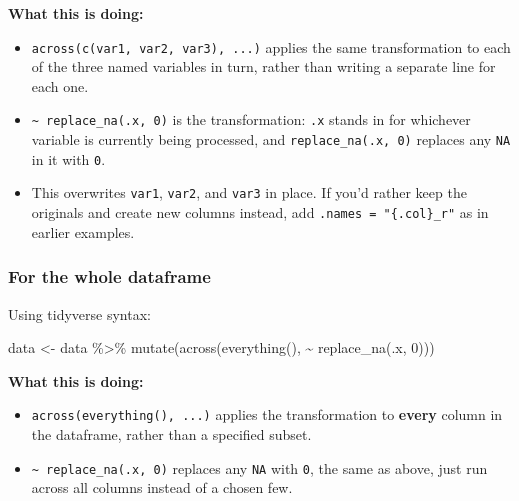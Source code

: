 \documentclass[
  letterpaper,
  DIV=11,
  numbers=noendperiod]{scrreprt}
\newenvironment{Shaded}{\begin{snugshade}}{\end{snugshade}}
\newcommand{\DecValTok}[1]{\textcolor[rgb]{0.68,0.00,0.00}{#1}}
\newcommand{\FunctionTok}[1]{\textcolor[rgb]{0.28,0.35,0.67}{#1}}
\newcommand{\NormalTok}[1]{\textcolor[rgb]{0.00,0.23,0.31}{#1}}
\newcommand{\OtherTok}[1]{\textcolor[rgb]{0.00,0.23,0.31}{#1}}
\newcommand{\SpecialCharTok}[1]{\textcolor[rgb]{0.37,0.37,0.37}{#1}}
\begin{document}
\textbf{What this is doing:}

\begin{itemize}
\item
  \texttt{across(c(var1,\ var2,\ var3),\ ...)} applies the same
  transformation to each of the three named variables in turn, rather
  than writing a separate line for each one.
\item
  \texttt{\textasciitilde{}\ replace\_na(.x,\ 0)} is the transformation:
  \texttt{.x} stands in for whichever variable is currently being
  processed, and \texttt{replace\_na(.x,\ 0)} replaces any \texttt{NA}
  in it with \texttt{0}.
\item
  This overwrites \texttt{var1}, \texttt{var2}, and \texttt{var3} in
  place. If you'd rather keep the originals and create new columns
  instead, add \texttt{.names\ =\ "\{.col\}\_r"} as in earlier examples.
\end{itemize}

\subsubsection{For the whole dataframe}\label{for-the-whole-dataframe}

Using tidyverse syntax:

\begin{Shaded}
\begin{Highlighting}[]
\NormalTok{data }\OtherTok{\textless{}{-}}\NormalTok{ data }\SpecialCharTok{\%\textgreater{}\%}
  \FunctionTok{mutate}\NormalTok{(}\FunctionTok{across}\NormalTok{(}\FunctionTok{everything}\NormalTok{(), }\SpecialCharTok{\textasciitilde{}} \FunctionTok{replace\_na}\NormalTok{(.x, }\DecValTok{0}\NormalTok{)))}
\end{Highlighting}
\end{Shaded}

\textbf{What this is doing:}

\begin{itemize}
\item
  \texttt{across(everything(),\ ...)} applies the transformation to
  \textbf{every} column in the dataframe, rather than a specified
  subset.
\item
  \texttt{\textasciitilde{}\ replace\_na(.x,\ 0)} replaces any
  \texttt{NA} with \texttt{0}, the same as above, just run across all
  columns instead of a chosen few.
\end{itemize}
\end{document}
